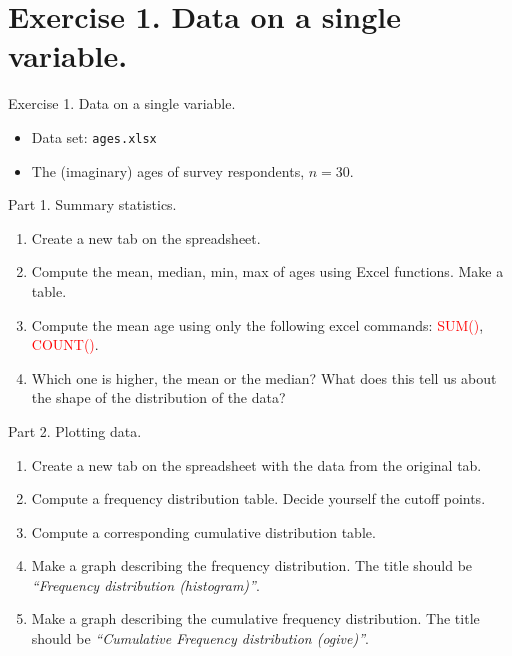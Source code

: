 \documentclass[
  10pt,
  ignorenonframetext,
]{beamer}
\begin{document}
\hypertarget{exercise-1.-data-on-a-single-variable.}{%
\section{Exercise 1. Data on a single
variable.}\label{exercise-1.-data-on-a-single-variable.}}

\begin{frame}{Exercise 1. Data on a single variable.}
\begin{itemize}
\item
  Data set: \texttt{ages.xlsx}
\item
  The (imaginary) ages of survey respondents, \(n = 30\).
\end{itemize}
\end{frame}

\begin{frame}{Part 1. Summary statistics.}
\protect\hypertarget{part-1.-summary-statistics.}{}
\begin{enumerate}
\item
  Create a new tab on the spreadsheet.
\item
  Compute the mean, median, min, max of ages using Excel functions. Make
  a table.
\item
  Compute the mean age using only the following excel commands:
  \textcolor{red}{SUM()}, \textcolor{red}{COUNT()}.
\item
  Which one is higher, the mean or the median? What does this tell us
  about the shape of the distribution of the data?
\end{enumerate}
\end{frame}

\begin{frame}{Part 2. Plotting data.}
\protect\hypertarget{part-2.-plotting-data.}{}
\begin{enumerate}
\item
  Create a new tab on the spreadsheet with the data from the original
  tab.
\item
  Compute a frequency distribution table. Decide yourself the cutoff
  points.
\item
  Compute a corresponding cumulative distribution table.
\item
  Make a graph describing the frequency distribution. The title should
  be \emph{``Frequency distribution (histogram)''}.
\item
  Make a graph describing the cumulative frequency distribution. The
  title should be \emph{``Cumulative Frequency distribution (ogive)''}.
\end{enumerate}
\end{frame}
\end{document}
